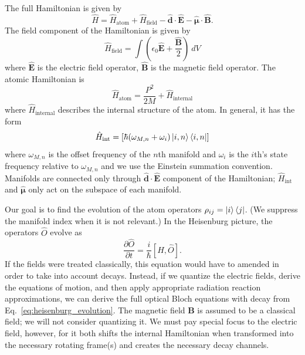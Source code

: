 \documentclass[final,5p,times,twocolumn]{elsarticle}
\begin{document}
The full Hamiltonian is given by
\begin{equation}
    \label{eq:obe:generic_hamiltonian}
    \hat{H} = \hat{H}_\text{atom} + \hat{H}_\text{field} -
    \hat{\boldsymbol{d}}\cdot\hat{\mathbf{E}} -
    \hat{\boldsymbol{\mu}}\cdot\hat{\mathbf{B}}.
\end{equation}
The field component of the Hamiltonian is given by
\begin{equation}
    \label{eq:obe:field}
    \hat{H}_\text{field} = \int \left(\epsilon_0 \hat{\mathbf{E}} +
    \frac{\hat{\mathbf{B}}}{2}\right)\ dV
\end{equation}
where $\hat{\mathbf{E}}$ is the electric field operator, $\hat{\mathbf{B}}$ is the magnetic field operator.
The atomic Hamiltonian is 
\begin{equation}
    \hat{H}_\text{atom} = \frac{P^2}{2M} + \hat{H}_\text{internal}
\end{equation}
where $\hat{H}_\text{internal}$ describes the internal structure of the atom.
In general, it has the form
\begin{equation}
	\hat{H}_\text{int} = \left[\hbar(\omega_{M,n} + \omega_i)\ket{i,n}\Bra{i, n}\right]
\end{equation}
where $\omega_{M,n}$ is the offset frequency of the $n$th manifold and $\omega_i$ is the $i$th's state frequency relative to $\omega_{M,n}$ and we use the Einstein summation convention.  Manifolds are connected only through $\hat{\mathbf{d}}\cdot\hat{\mathbf{E}}$ component of the Hamiltonian; $\hat{H}_\text{int}$ and $\hat{\boldsymbol{\mu}}$ only act on the subspace of each manifold.

Our goal is to find the evolution of the atom operators $\rho_{ij} = \ket{i}\Bra{j}$.  (We suppress the manifold index when it is not relevant.)  In the Heisenburg picture, the operators $\hat{O}$ evolve as
\begin{equation}
	\label{eq:heisenburg_evolution}
	\frac{\partial \hat{O}}{\partial t}  = \frac{i}{\hbar}[\hat{H}, \hat{O}].
\end{equation}
If the fields were treated classically, this equation would have to amended in order to take into account decays.  Instead, if we quantize the electric fields, derive the equations of motion, and then apply appropriate radiation reaction approximations, we can derive the full optical Bloch equations with decay from Eq.~\ref{eq:heisenburg_evolution}.  The magnetic field $\mathbf{B}$ is assumed to be a classical field; we will not consider quantizing it.  We must pay special focus to the electric field, however, for it both shifts the internal Hamiltonian when transformed into the necessary rotating frame(s) and creates the necessary decay channels.
\end{document}
